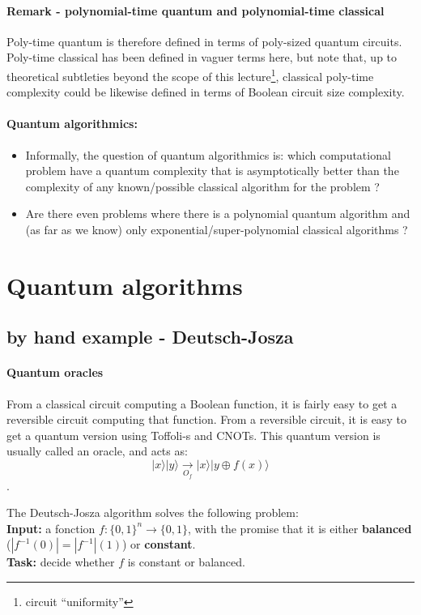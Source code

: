\documentclass{article}
\begin{document}
\paragraph{Remark - polynomial-time quantum and polynomial-time classical} Poly-time quantum is therefore
defined in terms of poly-sized quantum circuits. Poly-time classical
has been defined in vaguer terms here, but note that, up to theoretical
subtleties beyond the scope of this lecture\footnote{circuit ``uniformity''
}, classical poly-time complexity could be likewise defined in terms
of Boolean circuit size complexity.

\paragraph{Quantum algorithmics:}
\begin{itemize}
\item Informally, the question of quantum algorithmics is: which computational problem
have a quantum complexity that is asymptotically better than the complexity
of any known/possible classical algorithm for the problem ?
\item Are there even problems where there is a polynomial quantum algorithm and (as far as we
know) only exponential/super-polynomial classical algorithms ?
\end{itemize}

\section{Quantum algorithms}

\subsection{by hand example - Deutsch-Josza}

\paragraph{Quantum oracles}
From a classical circuit computing a Boolean function, it is fairly easy to get a reversible 
circuit computing that function.
From a reversible circuit, it is easy to get a quantum 
version using Toffoli-s and CNOTs. This quantum version is usually called an oracle,
and acts as:
$$|x\rangle|y\rangle\xrightarrow[O_f]{}|x\rangle|y\oplus f(x)\rangle$$.

The Deutsch-Josza algorithm solves the following problem:\\
\textbf{Input:} a fonction $f:\{0,1\}^{n}\rightarrow \{0,1\}$,
with the promise that it is either \textbf{balanced} ($|f^{-1}(0)|=|f^{-1}|(1)$) or
\textbf{constant}.\\
\textbf{Task:} decide whether $f$ is constant or balanced.
\end{document}
